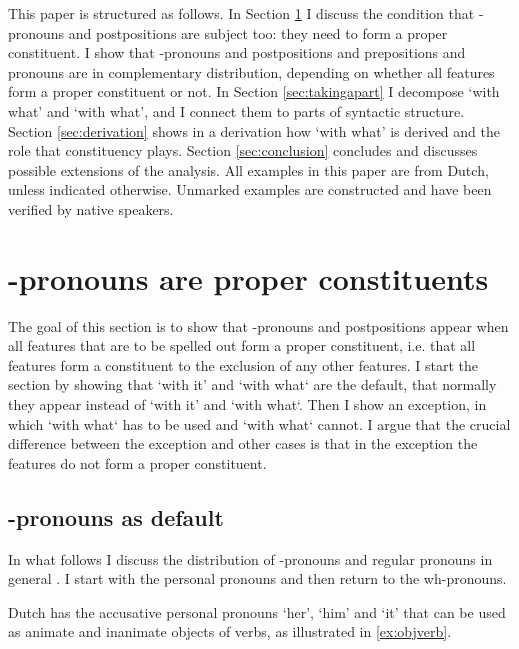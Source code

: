 \documentclass[12pt]{article}
\begin{document}
This paper is structured as follows. In Section \ref{sec:distribution} I discuss the condition that -pronouns and postpositions are subject too: they need to form a proper constituent. I show that -pronouns and postpositions and prepositions and pronouns are in complementary distribution, depending on whether all features form a proper constituent or not.
In Section \ref{sec:takingapart} I decompose  `with what' and  `with what', and I connect them to parts of syntactic structure. Section \ref{sec:derivation} shows in a derivation how  `with what' is derived and the role that constituency plays. Section \ref{sec:conclusion} concludes and discusses possible extensions of the analysis. All examples in this paper are from Dutch, unless indicated otherwise. Unmarked examples are constructed and have been verified by native speakers.


\section{-pronouns are proper constituents}\label{sec:distribution}

The goal of this section is to show that -pronouns and postpositions appear when all features that are to be spelled out form a proper constituent, i.e. that all features form a constituent to the exclusion of any other features. I start the section by showing that  `with it' and  `with what` are the default, that normally they appear instead of  `with it' and  `with what`. Then I show an exception, in which  `with what` has to be used and  `with what` cannot. I argue that the crucial difference between the exception and other cases is that in the exception the features do not form a proper constituent.


\subsection{-pronouns as default}\label{sec:rdefault}

In what follows I discuss the distribution of -pronouns and regular pronouns in general \citep{riemsdijk1978,koopman2000}. I start with the personal pronouns and then return to the wh-pronouns.

Dutch has the accusative personal pronouns  `her',  `him' and  `it' that can be used as animate and inanimate objects of verbs, as illustrated in \ref{ex:objverb}.
\end{document}
